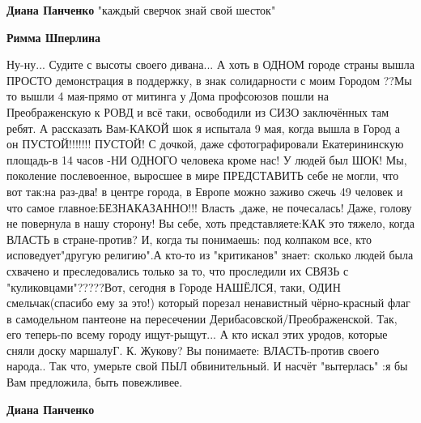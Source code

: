 \begin{itemize}
\begin{itemize}
 
\textbf{Диана Панченко} "каждый сверчок знай свой шесток"

 

\textbf{Римма Шперлина} 

Ну-ну... Судите с высоты своего дивана... А хоть в ОДНОМ
городе страны вышла ПРОСТО демонстрация в поддержку, в знак солидарности с моим
Городом ??Мы то вышли 4 мая-прямо от митинга у Дома профсоюзов пошли на
Преображенскую к РОВД и всё таки, освободили из СИЗО заключённых там ребят. А
рассказать Вам-КАКОЙ шок я испытала 9 мая, когда вышла в Город а он
ПУСТОЙ!!!!!!! ПУСТОЙ! С дочкой, даже сфотографировали Екатерининскую площадь-в 14
часов -НИ ОДНОГО человека кроме нас! У людей был ШОК! Мы, поколение
послевоенное, выросшее в мире ПРЕДСТАВИТЬ себе не могли, что вот так:на раз-два!
в центре города, в Европе можно заживо сжечь 49 человек и что самое
главное:БЕЗНАКАЗАННО!!! Власть ,даже, не почесалась! Даже, голову не повернула в
нашу сторону! Вы себе, хоть представляете:КАК это тяжело, когда ВЛАСТЬ в
стране-против? И, когда ты понимаешь: под колпаком все, кто исповедует"другую
религию".А кто-то из "критиканов" знает: сколько людей была схвачено и
преследовались только за то, что проследили их СВЯЗЬ с
"куликовцами"?????Вот, сегодня в Городе НАШЁЛСЯ, таки, ОДИН смельчак(спасибо ему
за это!) который порезал ненавистный чёрно-красный флаг в самодельном пантеоне
на пересечении Дерибасовской/Преображенской. Так, его теперь-по всему городу
ищут-рыщут... А кто искал этих уродов, которые сняли доску маршалуГ. К. Жукову? Вы
понимаете: ВЛАСТЬ-против своего народа.. Так что, умерьте свой ПЫЛ
обвинительный. И насчёт "вытерлась" :я бы Вам предложила, быть повежливее.

 
\textbf{Диана Панченко} 👏👏👏👏👏👏👏👏👏👏👏👏👏👏


\end{itemize}
\end{itemize}
